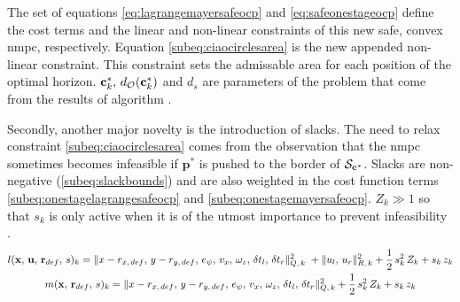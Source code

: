 The set of equations \eqref{eq:lagrangemayersafeocp} and \eqref{eq:safeonestageocp} define the cost terms and the linear and non-linear constraints of this new safe, convex \acrshort{nmpc}, respectively. Equation \eqref{subeq:ciaocirclesarea} is the new appended non-linear constraint. This constraint sets the admissable area for each position of the optimal horizon. $\mathbf{c}_k^*,\,d_{\mathcal{O}}(\mathbf{c}_k^*)$ and $d_s$ are parameters of the problem that come from the results of algorithm .

Secondly, another major novelty is the introduction of slacks. The need to relax constraint \eqref{subeq:ciaocirclesarea} comes from the observation that the \acrshort{nmpc} sometimes becomes infeasible if $\mathbf{p}^*$ is pushed to the border of $\mathcal{S}_{\mathbf{c}^*}$. Slacks are non-negative (\ref{subeq:slackbounds}) and are also weighted in the cost function terms \eqref{subeq:onestagelagrangesafeocp} and \eqref{subeq:onestagemayersafeocp}. $Z_k \gg 1$ so that $s_k$ is only active when it is of the utmost importance to prevent infeasibility \cite{schoels2020nmpc}.
\begin{subequations}
\begin{gather}
l(\mathbf{x},\,\mathbf{u},\,\mathbf{r}_{def},\,s)_k = \Vert x - r_{x,\,def},\,y - r_{y,\,def},\,e_{\psi},\,v_x,\,\omega_z,\,\delta t_l,\,\delta t_r\Vert_{Q,\,k}^2 \; + \Vert u_l,\,u_r \Vert_{R,\,k}^2 + \frac{1}{2}\,s_k^2\,Z_k+ s_k\,z_k\label{subeq:onestagelagrangesafeocp}\\
m(\mathbf{x},\,\mathbf{r}_{def},\,s)_k = \Vert x - r_{x,\,def},\,y - r_{y,\,def},\,e_{\psi},\,v_x,\,\omega_z,\,\delta t_l,\,\delta t_r\Vert_{Q,\,k}^2 + \frac{1}{2}\,s_k^2\,Z_k+ s_k\,z_k\label{subeq:onestagemayersafeocp}
\end{gather}
\label{eq:lagrangemayersafeocp}
\end{subequations}
\vspace{-1.2cm}
